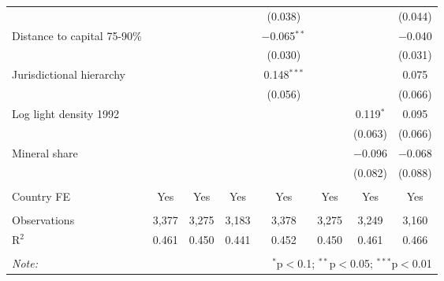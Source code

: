 \begin{table}[!htbp]
\begin{tabular}{@{\extracolsep{2pt}}lccccccc}
  &  &  &  & (0.038) &  &  & (0.044) \\ 
  Distance to capital 75-90\% &  &  &  & $-$0.065$^{**}$ &  &  & $-$0.040 \\ 
  &  &  &  & (0.030) &  &  & (0.031) \\ 
  Jurisdictional hierarchy &  &  &  & 0.148$^{***}$ &  &  & 0.075 \\ 
  &  &  &  & (0.056) &  &  & (0.066) \\ 
  Log light density 1992 &  &  &  &  &  & 0.119$^{*}$ & 0.095 \\ 
  &  &  &  &  &  & (0.063) & (0.066) \\ 
  Mineral share &  &  &  &  &  & $-$0.096 & $-$0.068 \\ 
  &  &  &  &  &  & (0.082) & (0.088) \\ 
 \hline \\[-1.8ex] 
Country FE & Yes & Yes & Yes & Yes & Yes & Yes & Yes \\ 
\hline \\[-1.8ex] 
Observations & 3,377 & 3,275 & 3,183 & 3,378 & 3,275 & 3,249 & 3,160 \\ 
R$^{2}$ & 0.461 & 0.450 & 0.441 & 0.452 & 0.450 & 0.461 & 0.466 \\ 
\hline 
\hline \\[-1.8ex] 
\textit{Note:}  & \multicolumn{7}{r}{$^{*}$p$<$0.1; $^{**}$p$<$0.05; $^{***}$p$<$0.01} \\ 
\end{tabular} 
\end{table} 
